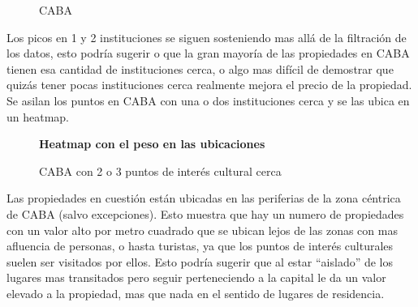 \documentclass[a4paper, 10pt]{article}
\newcommand\tab[1][0.5cm]{\hspace*{#1}}
\begin{document}
				\begin{figure}[H]
    				\centering
    				\caption{CABA}
				\end{figure}
				
				
				Los picos en 1 y 2 instituciones se siguen sosteniendo mas allá de la filtración de 
				los datos, esto podría sugerir o que la gran mayoría de las propiedades en CABA 
				tienen esa cantidad de instituciones cerca, o algo mas difícil de demostrar que 
				quizás tener pocas instituciones cerca realmente mejora el precio de la propiedad.\\
				\tab Se asilan los puntos en CABA con una o dos instituciones cerca y se las ubica en un heatmap.
				
				\begin{figure}[H]
    				\centering
    				\textbf{Heatmap con el peso en las ubicaciones}\par\medskip
    				\caption{CABA  con 2 o 3 puntos de interés cultural cerca}
				\end{figure}				
				
				
				Las propiedades en cuestión están ubicadas en las periferias de la zona céntrica de CABA  
				(salvo excepciones). Esto muestra que hay un numero de propiedades con un valor alto 
				por metro cuadrado que se ubican lejos de las zonas con mas afluencia de personas, 
				o hasta turistas, ya que los puntos de interés culturales suelen ser visitados por 
				ellos. Esto podría sugerir que al estar “aislado” de los lugares mas transitados 
				pero seguir perteneciendo a la capital le da un valor elevado a la propiedad, 
				mas que nada en el sentido de lugares de residencia.\\
				
\end{document}
